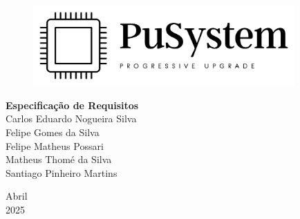\documentclass[a5paper, 12pt]{article}
\begin{document}

\begin{titlepage}
	\begin{center}
	
	\begin{figure}[!ht]
	\centering
	\includegraphics[width=10cm]{dist/LogoTransparentePreto.png} \\ 
    \end{figure}

        
		\vspace{115pt}
        \textbf{\Huge{Especificação de Requisitos}}\\
        
		\vspace{115pt}
        Carlos Eduardo Nogueira Silva \\
        Felipe Gomes da Silva \\
        Felipe Matheus Possari \\
        Matheus Thomé da Silva\\ 
        Santiago Pinheiro Martins \\
	\end{center}
	
	
	\vspace{1cm}
	\begin{center}
		\vspace{\fill}
		 Abril \\
		 2025
			\end{center}
\end{titlepage}




\newpage
\thispagestyle{empty}
\tableofcontents

\newpage
\pagestyle{fancy}

\fancyhead[L]{\thepage}
\fancyhead[C]{\nouppercase{\leftmark}}
\fancyfoot[R]{}
\fancyfoot[L]{}
\setlength\headheight{26pt}
\end{document}
